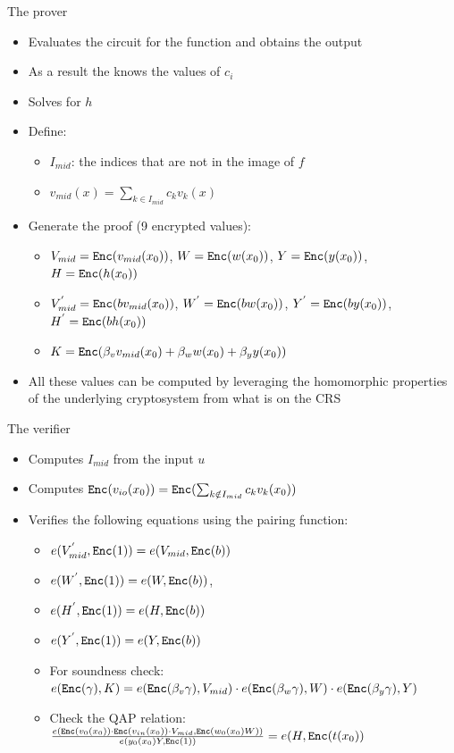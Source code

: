 \documentclass[handout]{beamer}
\begin{document}
\begin{frame}{The prover}
\begin{itemize}
    \item Evaluates the circuit for the function and obtains the output
    \item As a result the \prv knows the values of $c_i$
    \item Solves for $h$
    \item Define:
    \begin{itemize}
        \item $I_{mid}$: the indices that are not in the image of $f$
        \item $v_{mid}(x) = \sum_{k \in I_{mid}} c_k v_k(x)$
    \end{itemize}
    \item Generate the proof (9 encrypted values):
    \begin{itemize}
        \item $V_{mid} = \mathtt{Enc}(v_{mid}(x_0))$, $W = \mathtt{Enc}(w(x_0))$, 
        $Y=\mathtt{Enc}(y(x_0))$, $H = \mathtt{Enc}(h(x_0))$
        \item $V_{mid}^{'} = \mathtt{Enc}(b v_{mid}(x_0))$, $W^{'} = \mathtt{Enc}(b w(x_0))$, $Y^{'}=\mathtt{Enc}(by(x_0))$, $H^{'} = \mathtt{Enc}(bh(x_0))$
        \item $K = \mathtt{Enc}(\beta_v v_{mid}(x_0) + \beta_w w(x_0)+\beta_y y(x_0)) $
    \end{itemize}
    \item All these values can be computed by leveraging the homomorphic properties of the underlying cryptosystem from what is on the CRS 
\end{itemize}
\end{frame}

\begin{frame}{The verifier}
\begin{itemize}
    \item Computes $I_{mid}$ from the input $u$
    \item Computes $\mathtt{Enc}(v_{io}(x_0)) = \mathtt{Enc}(\sum_{k \notin I_{mid}} c_k v_k(x_0))$
    \item Verifies the following equations using the pairing function:
    \begin{itemize}
        \item $e(V_{mid}^{'},\mathtt{Enc}(1)) = e(V_{mid},\mathtt{Enc}(b))$ 
        \item $e(W^{'},\mathtt{Enc}(1)) = e(W,\mathtt{Enc}(b))$,
        \item $e(H^{'},\mathtt{Enc}(1)) = e(H,\mathtt{Enc}(b))$
        \item $e(Y^{'},\mathtt{Enc}(1)) = e(Y,\mathtt{Enc}(b))$
        \item For soundness check:\\
        $e(\mathtt{Enc}(\gamma),K) = e(\mathtt{Enc}(\beta_v \gamma),V_{mid}) \cdot e(\mathtt{Enc}(\beta_w \gamma),W) \cdot e(\mathtt{Enc}(\beta_y \gamma),Y)$  
        \item Check the QAP relation:\\
        $\frac{e(\mathtt{Enc}(v_0(x_0))\cdot \mathtt{Enc}(v_{in}(x_0)) \cdot V_{mid},\mathtt{Enc}(w_0(x_0)W))}{e(y_0(x_0)Y,\mathtt{Enc}(1))} = e(H,\mathtt{Enc}(t(x_0))$  
    \end{itemize}
\end{itemize}
\end{frame}
\end{document}

